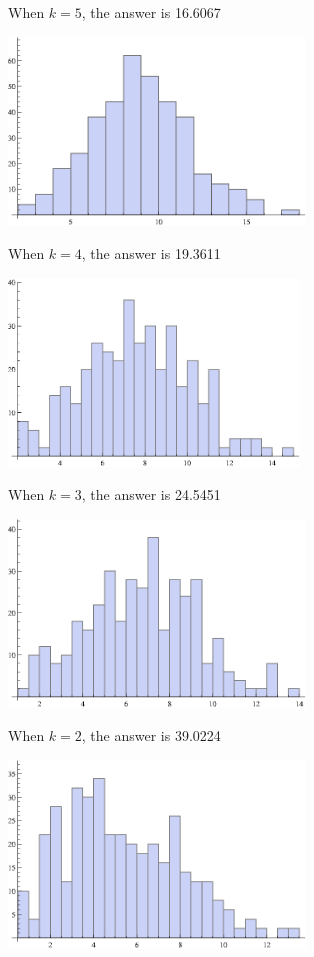 \documentclass[a4paper, 12pt]{mcshw}
\begin{document}
\begin{enumerate}
\begin{solution}
\begin{center}
        \end{center}
        When $k = 5$, the answer is 16.6067
        \begin{center}
            \includegraphics[height=5cm]{1_gr4.eps}
        \end{center}
        When $k = 4$, the answer is 19.3611
        \begin{center}
            \includegraphics[height=5cm]{1_gr5.eps}
        \end{center}
        When $k = 3$, the answer is 24.5451
        \begin{center}
            \includegraphics[height=5cm]{1_gr6.eps}
        \end{center}
        When $k = 2$, the answer is 39.0224
        \begin{center}
            \includegraphics[height=5cm]{1_gr7.eps}

\end{center}
\end{solution}
\end{enumerate}
\end{document}
